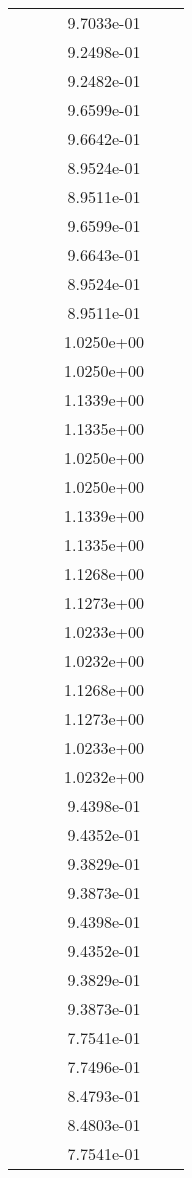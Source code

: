 \begin{xltabular}{\textwidth}{r|rS[table-format=1.3e+2]S[table-format=1.4e+2]S[table-format=1.4e+2]S[table-format=-1.5]}
&  &  & 9.7033e-01 & & \\
&  &  & 9.2498e-01 & & \\
&  &  & 9.2482e-01 & & \\
&  &  & 9.6599e-01 & & \\
&  &  & 9.6642e-01 & & \\
&  &  & 8.9524e-01 & & \\
&  &  & 8.9511e-01 & & \\
&  &  & 9.6599e-01 & & \\
&  &  & 9.6643e-01 & & \\
&  &  & 8.9524e-01 & & \\
&  &  & 8.9511e-01 & & \\
&  &  & 1.0250e+00 & & \\
&  &  & 1.0250e+00 & & \\
&  &  & 1.1339e+00 & & \\
&  &  & 1.1335e+00 & & \\
&  &  & 1.0250e+00 & & \\
&  &  & 1.0250e+00 & & \\
&  &  & 1.1339e+00 & & \\
&  &  & 1.1335e+00 & & \\
&  &  & 1.1268e+00 & & \\
&  &  & 1.1273e+00 & & \\
&  &  & 1.0233e+00 & & \\
&  &  & 1.0232e+00 & & \\
&  &  & 1.1268e+00 & & \\
&  &  & 1.1273e+00 & & \\
&  &  & 1.0233e+00 & & \\
&  &  & 1.0232e+00 & & \\
&  &  & 9.4398e-01 & & \\
&  &  & 9.4352e-01 & & \\
&  &  & 9.3829e-01 & & \\
&  &  & 9.3873e-01 & & \\
&  &  & 9.4398e-01 & & \\
&  &  & 9.4352e-01 & & \\
&  &  & 9.3829e-01 & & \\
&  &  & 9.3873e-01 & & \\
&  &  & 7.7541e-01 & & \\
&  &  & 7.7496e-01 & & \\
&  &  & 8.4793e-01 & & \\
&  &  & 8.4803e-01 & & \\
&  &  & 7.7541e-01 & & \\

\end{xltabular}
